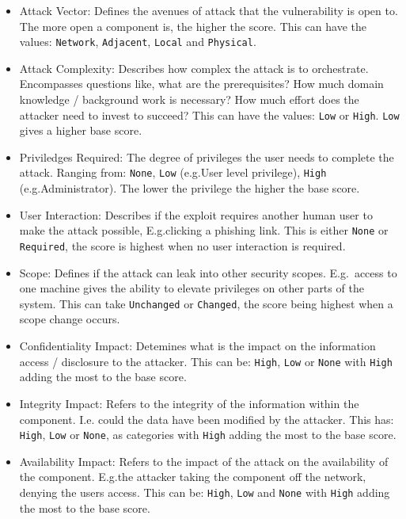 \documentclass[12pt]{article}
\begin{document}
\begin{itemize}

	\item Attack Vector: Defines the avenues of attack that the vulnerability is open to. The more
	      open a component is, the higher the score. This can have the values: \texttt{Network},
	      \texttt{Adjacent}, \texttt{Local} and \texttt{Physical}.

	\item Attack Complexity: Describes how complex the attack is to orchestrate. Encompasses
	      questions like, what are the prerequisites? How much domain knowledge / background work is
	      necessary? How much effort does the attacker need to invest to succeed? This can have the
	      values: \texttt{Low} or \texttt{High}. \texttt{Low} gives a higher base score.

	\item Priviledges Required: The degree of privileges the user needs to complete the attack.
	      Ranging from: \texttt{None}, \texttt{Low} (e.g.\@ User level privilege), \texttt{High}
	      (e.g.\@ Administrator). The lower the privilege the higher the base score.

	\item User Interaction: Describes if the exploit requires another human user to make the attack
	      possible, E.g.\@ clicking a phishing link. This is either \texttt{None} or
	      \texttt{Required}, the score is highest when no user interaction is required.

	\item Scope: Defines if the attack can leak into other security scopes. E.g.\@~access to one
	      machine gives the ability to elevate privileges on other parts of the system. This can take
	      \texttt{Unchanged} or \texttt{Changed}, the score being highest when a scope change occurs.

	\item Confidentiality Impact: Detemines what is the impact on the information access /
	      disclosure to the attacker. This can be: \texttt{High}, \texttt{Low} or \texttt{None} with
	      \texttt{High} adding the most to the base score.

	\item Integrity Impact: Refers to the integrity of the information within the component. I.e.\@
	      could the data have been modified by the attacker. This has: \texttt{High}, \texttt{Low} or
	      \texttt{None}, as categories with \texttt{High} adding the most to the base score.

	\item Availability Impact: Refers to the impact of the attack on the availability of the
	      component. E.g.\@ the attacker taking the component off the network, denying the users
	      access. This can be: \texttt{High}, \texttt{Low} and \texttt{None} with \texttt{High} adding
	      the most to the base score.

\end{itemize}
\end{document}
